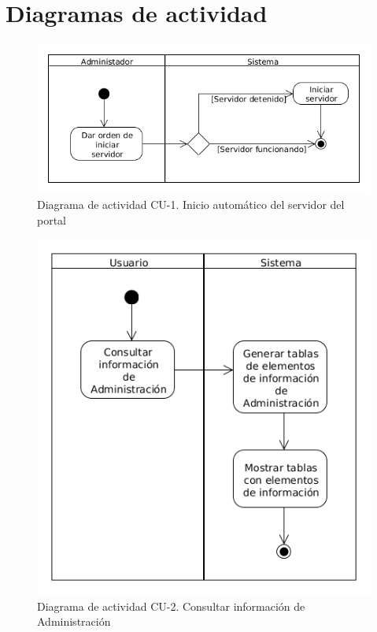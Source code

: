 \newpage
\
\newpage
\section{Diagramas de actividad}

\begin{figure}[!ht]
  \begin{center}
  \includegraphics[width=1\textwidth]{imagenes/diag_act_cu_01.png}
  \caption{Diagrama de actividad CU-1. Inicio automático del servidor del portal}
  \label{fig:diag_act_cu_01}
  \end{center}
\end{figure}

\begin{figure}[!ht]
  \begin{center}
  \includegraphics[width=1\textwidth]{imagenes/diag_act_cu_02.png}
  \caption{Diagrama de actividad CU-2. Consultar información de Administración}
  \label{fig:diag_act_cu_02}
  \end{center}
\end{figure}

